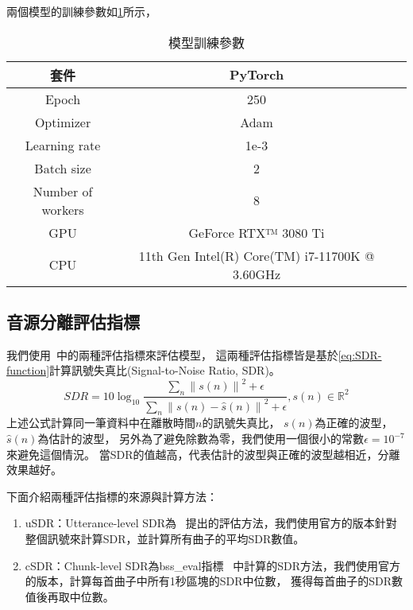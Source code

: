 \documentclass[class=NCU_thesis, crop=false]{standalone}
\begin{document}
兩個模型的訓練參數如\cref{table:table-training-parameters}所示，
\begin{table}[H]
    \centering
    \caption{模型訓練參數}
    \label{table:table-training-parameters}
    \begin{tabular}{|c|c|c|}
        \hline
        \multicolumn{1}{|c|}{套件} & \multicolumn{1}{|c|}{PyTorch} \\
        \hline
        Epoch & 250 \\
        \hline
        Optimizer & Adam \\
        \hline
        Learning rate & 1e-3 \\
        \hline
        Batch size & 2 \\
        \hline
        Number of workers & 8 \\
        \hline
        GPU & GeForce RTX™ 3080 Ti \\
        \hline
        CPU & 11th Gen Intel(R) Core(TM) i7-11700K @ 3.60GHz \\
        \hline
    \end{tabular}
\end{table}


\subsection{音源分離評估指標}
我們使用~\cite{Luo_Yi2022MusicSourceSeparation}中的兩種評估指標來評估模型，
這兩種評估指標皆是基於\cref{eq:SDR-function}計算訊號失真比(Signal-to-Noise Ratio, SDR)。
\begin{equation}
    \label{eq:SDR-function}
    SDR = 10\log _{10}
    \frac{\sum _{n}\left\lVert s(n)\right\rVert^{2} + \epsilon }
    {\sum _{n}\left\lVert s(n)-\hat{s}(n) \right\rVert^{2} + \epsilon}, s(n)\in \mathbb{R}^{2}
\end{equation}
上述公式計算同一筆資料中在離散時間$n$的訊號失真比，
$s(n)$為正確的波型，$\hat{s}(n)$為估計的波型，
另外為了避免除數為零，我們使用一個很小的常數$\epsilon = 10^{-7}$來避免這個情況。
當SDR的值越高，代表估計的波型與正確的波型越相近，分離效果越好。

下面介紹兩種評估指標的來源與計算方法：
\begin{enumerate}
    \item uSDR：Utterance-level SDR為~\cite{Yuki_Mitsufuji2021MusicDemixing}
    提出的評估方法，我們使用官方的版本針對整個訊號來計算SDR，並計算所有曲子的平均SDR數值。
    \item cSDR：Chunk-level SDR為bss\_eval指標~\cite{Vincent2006Performance}
    中計算的SDR方法，我們使用官方的版本，計算每首曲子中所有1秒區塊的SDR中位數，
    獲得每首曲子的SDR數值後再取中位數。
\end{enumerate}
\end{document}
